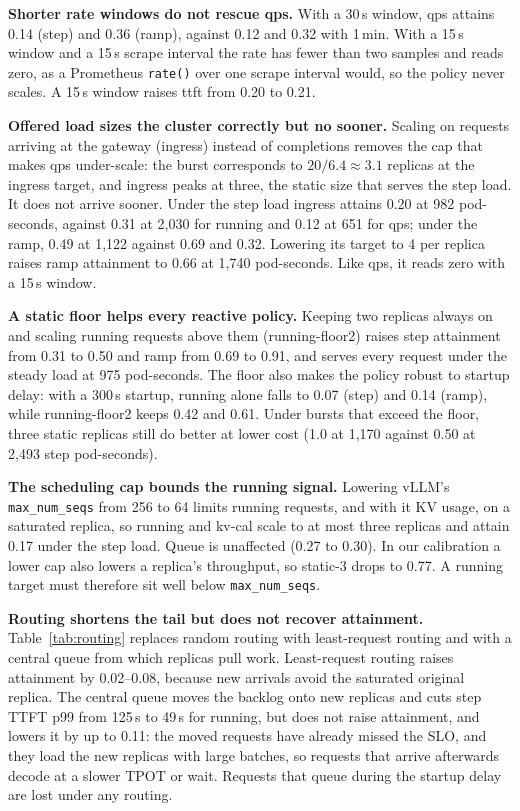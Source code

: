 \documentclass[10pt,conference]{IEEEtran}
\begin{document}
\textbf{Shorter rate windows do not rescue qps.} With a 30\,s window, qps attains
0.14 (step) and 0.36 (ramp), against 0.12 and 0.32 with 1\,min. With a 15\,s
window and a 15\,s scrape interval the rate has fewer than two samples and
reads zero, as a Prometheus \texttt{rate()} over one scrape interval would,
so the policy never scales. A 15\,s window raises ttft from 0.20 to 0.21.

\textbf{Offered load sizes the cluster correctly but no sooner.} Scaling on
requests arriving at the gateway (ingress) instead of completions removes the
cap that makes qps under-scale: the burst corresponds to $20/6.4 \approx 3.1$
replicas at the ingress target, and ingress peaks at three, the static size
that serves the step load. It does not arrive sooner. Under the
step load ingress attains 0.20 at 982 pod-seconds, against 0.31 at 2{,}030 for
running and 0.12 at 651 for qps; under the ramp, 0.49 at 1{,}122 against 0.69
and 0.32. Lowering its target to 4 per replica raises ramp attainment to 0.66
at 1{,}740 pod-seconds. Like qps, it reads zero with a 15\,s window.

\textbf{A static floor helps every reactive policy.} Keeping two replicas
always on and scaling running requests above them (running-floor2) raises step
attainment from 0.31 to 0.50 and ramp from 0.69 to 0.91, and serves every
request under the steady load at 975 pod-seconds. The floor also makes the
policy robust to startup delay: with a 300\,s startup, running alone falls to
0.07 (step) and 0.14 (ramp), while running-floor2 keeps 0.42 and 0.61. Under
bursts that exceed the floor, three static replicas still do better at lower
cost (1.0 at 1{,}170 against 0.50 at 2{,}493 step pod-seconds).

\textbf{The scheduling cap bounds the running signal.} Lowering vLLM's
\texttt{max\_num\_seqs} from 256 to 64 limits running requests, and with it
KV usage, on a saturated replica, so running and kv-cal scale to at most three
replicas and attain 0.17 under the step load. Queue is unaffected (0.27 to
0.30). In our calibration a lower cap also lowers a replica's throughput, so
static-3 drops to 0.77. A running target must therefore sit well below
\texttt{max\_num\_seqs}.



\textbf{Routing shortens the tail but does not recover attainment.}
Table~\ref{tab:routing} replaces random routing with least-request routing
and with a central queue from which replicas pull work. Least-request routing
raises attainment by 0.02--0.08, because new arrivals avoid the saturated
original replica. The central queue moves the backlog onto new replicas and
cuts step TTFT p99 from 125\,s to 49\,s for running, but does not raise
attainment, and lowers it by up to 0.11: the moved requests have already
missed the SLO, and they load the new replicas with large batches, so requests
that arrive afterwards decode at a slower TPOT or wait. Requests that queue during the startup delay are lost
under any routing.
\end{document}
